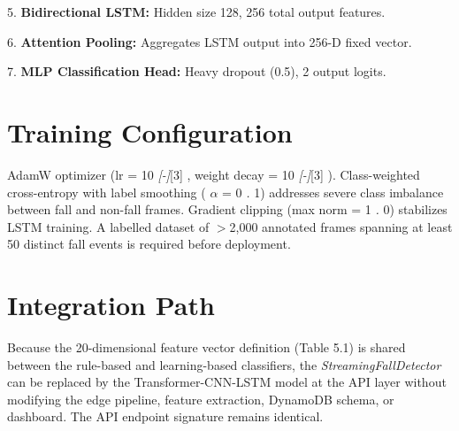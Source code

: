 5. \textbf{Bidirectional LSTM:} Hidden size 128, 256 total output features. 

6. \textbf{Attention Pooling:} Aggregates LSTM output into 256-D fixed vector. 

7. \textbf{MLP Classification Head:} Heavy dropout (0.5), 2 output logits. 

\section{Training Configuration}

AdamW optimizer (lr = 10 \textit{[-]}[3] , weight decay = 10 \textit{[-]}[3] ). Class-weighted cross-entropy with label smoothing ( \textit{$\alpha$} = 0 \textit{.} 1) addresses severe class imbalance between fall and non-fall frames. Gradient clipping (max norm = 1 \textit{.} 0) stabilizes LSTM training. A labelled dataset of $>$2,000 annotated frames spanning at least 50 distinct fall events is required before deployment. 

\section{Integration Path}

Because the 20-dimensional feature vector definition (Table 5.1) is shared between the rule-based and learning-based classifiers, the \textit{StreamingFallDetector} can be replaced by the Transformer-CNN-LSTM model at the API layer without modifying the edge pipeline, feature extraction, DynamoDB schema, or dashboard. The API endpoint signature remains identical. 

